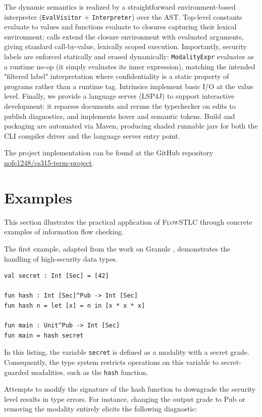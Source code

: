 \documentclass[conference]{IEEEtran}
\begin{document}
The dynamic semantics is realized by a straightforward environment-based interpreter (\texttt{EvalVisitor} + \texttt{Interpreter}) over the AST. Top-level constants evaluate to values and functions evaluate to closures capturing their lexical environment; calls extend the closure environment with evaluated arguments, giving standard call-by-value, lexically scoped execution. Importantly, security labels are enforced statically and erased dynamically: \texttt{ModalityExpr} evaluates as a runtime no-op (it simply evaluates its inner expression), matching the intended "filtered label" interpretation where confidentiality is a static property of programs rather than a runtime tag. Intrinsics implement basic I/O at the value level. Finally, we provide a language server (LSP4J) to support interactive development: it reparses documents and reruns the typechecker on edits to publish diagnostics, and implements hover and semantic tokens. Build and packaging are automated via Maven, producing shaded runnable jars for both the CLI compiler driver and the language server entry point.

The project implementation can be found at the GitHub repository \href{https://github.com/nofe1248/cs315-term-project}{nofe1248/cs315-term-project}.

\section{Examples}

This section illustrates the practical application of \textsc{FlowSTLC} through concrete examples of information flow checking.

The first example, adapted from the work on Granule \cite{orchard2019quantitative}, demonstrates the handling of high-security data types.

\begin{lstlisting}[style=mystyle]
val secret : Int [Sec] = [42]

fun hash : Int [Sec]^Pub -> Int [Sec]
fun hash n = let [x] = n in [x * x * x]

fun main : Unit^Pub -> Int [Sec]
fun main = hash secret
\end{lstlisting}

In this listing, the variable \texttt{secret} is defined as a modality with a secret grade. Consequently, the type system restricts operations on this variable to secret-guarded modalities, such as the \texttt{hash} function.

Attempts to modify the signature of the hash function to downgrade the security level results in type errors. For instance, changing the output grade to Pub or removing the modality entirely elicits the following diagnostic:
\end{document}
